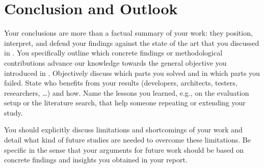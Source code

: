 \documentclass[../main-english]{subfiles}
\begin{document}
\chapter{Conclusion and Outlook}\label{sec:conclusion}

Your conclusions are more than a factual summary of your work: they position, interpret, and defend your findings against the state of the art that you discussed in .
You specifically outline which concrete findings or methodological contributions advance our knowledge towards the general objective you introduced in .
Objectively discuss which parts you solved and in which parts you failed.
State who benefits from your results (developers, architects, testers, researchers, \ldots) and how.
Name the lessons you learned, e.g., on the evaluation setup or the literature search, that help someone repeating or extending your study.

You should explicitly discuss limitations and shortcomings of your work and detail what kind of future studies are needed to overcome these limitations.
Be specific in the sense that your arguments for future work should be based on concrete findings and insights you obtained in your report.
\end{document}
